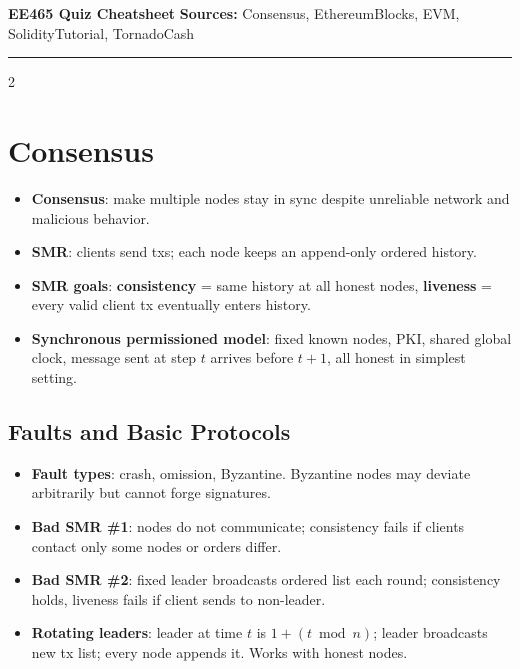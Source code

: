 \documentclass[10pt,a4paper]{article}
\newcommand{\term}[1]{\textbf{#1}}
\newcommand{\imp}[1]{\textbf{#1}}
\newcommand{\sep}{\vspace{2pt}\hrule\vspace{3pt}}
\begin{document}
\footnotesize
\sloppy

{\Large\bfseries EE465 Quiz Cheatsheet}\hfill
\textbf{Sources:} Consensus, EthereumBlocks, EVM, SolidityTutorial, TornadoCash

\sep
\begin{multicols*}{2}
\raggedcolumns

\section*{Consensus}
\begin{itemize}
\item \term{Consensus}: make multiple nodes stay in sync despite unreliable network and malicious behavior.
\item \term{SMR}: clients send txs; each node keeps an append-only ordered history.
\item \term{SMR goals}: \imp{consistency} = same history at all honest nodes, \imp{liveness} = every valid client tx eventually enters history.
\item \term{Synchronous permissioned model}: fixed known nodes, PKI, shared global clock, message sent at step $t$ arrives before $t+1$, all honest in simplest setting.
\end{itemize}

\subsection*{Faults and Basic Protocols}
\begin{itemize}
\item \term{Fault types}: crash, omission, Byzantine. Byzantine nodes may deviate arbitrarily but cannot forge signatures.
\item \term{Bad SMR \#1}: nodes do not communicate; consistency fails if clients contact only some nodes or orders differ.
\item \term{Bad SMR \#2}: fixed leader broadcasts ordered list each round; consistency holds, liveness fails if client sends to non-leader.
\item \term{Rotating leaders}: leader at time $t$ is $1+(t \bmod n)$; leader broadcasts new tx list; every node appends it. Works with honest nodes.
\end{itemize}


\end{multicols*}
\end{document}

